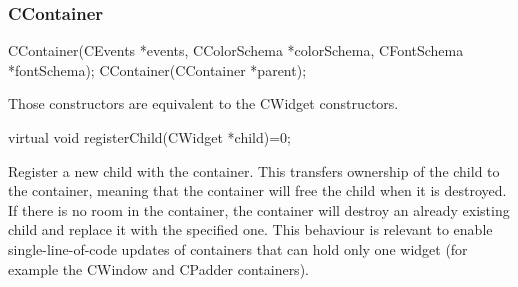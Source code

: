 \documentclass[a4paper,11pt]{journal}
\begin{document}
\subsubsection{CContainer}
\begin{verbatimtab}
CContainer(CEvents *events, CColorSchema *colorSchema,
CFontSchema *fontSchema);
CContainer(CContainer *parent);
\end{verbatimtab}
Those constructors are equivalent to the CWidget constructors.\\
\begin{verbatimtab}virtual void registerChild(CWidget *child)=0;\end{verbatimtab}
Register a new child with the container. This transfers ownership of the child to the container, meaning that the container will free the child when it is destroyed. If there is no room in the container, the container will destroy an already existing child and replace it with the specified one. This behaviour is relevant to enable single-line-of-code updates of containers that can hold only one widget (for example the CWindow and CPadder containers).
\end{document}

